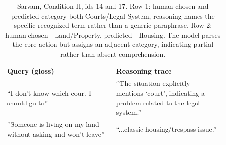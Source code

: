 \documentclass[11pt]{article}
\begin{document}



\begin{table}[H]
\centering
\small
\begin{tabular}{@{}p{0.44\linewidth}p{0.44\linewidth}@{}}
\toprule
\textbf{Query (gloss)} & \textbf{Reasoning trace} \\
\midrule
``I don't know which court I should go to'' & ``The situation explicitly mentions `court', indicating a problem related to the legal system.'' \\
\addlinespace
``Someone is living on my land without asking and won't leave'' & ``...classic housing/trespass issue.'' \\
\bottomrule
\end{tabular}
\caption{Sarvam, Condition H, ids 14 and 17. Row 1: human chosen and predicted category both Courts/Legal-System, reasoning names the specific recognized term rather than a generic paraphrase. Row 2: human chosen - Land/Property, predicted - Housing. The model parses the core action but assigns an adjacent category, indicating partial rather than absent comprehension.}
\label{tab:h-examples}
\end{table}
\end{document}
